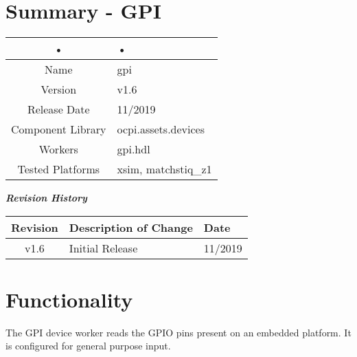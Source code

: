 \documentclass{article}
\author{} %
\date{Version \docVersion} %
\title{\docTitle}
\def\docVersion{1.6}
\begin{document}
\section*{Summary - GPI}
	\begin{tabular}{|c|M{13.5cm}|}
		\hline
		• & • \\
		\hline
		Name & gpi \\
		\hline
		Version & v\docVersion \\
		\hline
		Release Date & 11/2019 \\
		\hline
		Component Library & ocpi.assets.devices \\
		\hline
		Workers & gpi.hdl \\
		\hline
		Tested Platforms & xsim, matchstiq\_z1 \\
		\hline
	\end{tabular}
	
\begin{center}
	\textit{\textbf{Revision History}}
		\begin{table}[H]
		\label{table:revisions} %
			\begin{tabularx}{\textwidth}{|c|X|l|}
			\hline
			\rowcolor{blue}
			\textbf{Revision} & \textbf{Description of Change} & \textbf{Date} \\
		    \hline
		    v1.6 & Initial Release & 11/2019 \\
		    \hline
			\end{tabularx}
		\end{table}
	\end{center}	
	
\section*{Functionality}
\begin{flushleft}
The GPI device worker reads the GPIO pins present on an embedded platform. It is configured for general purpose input.

\end{flushleft}
\end{document}

